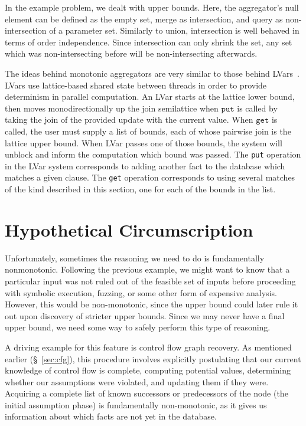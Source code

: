 In the example problem, we dealt with upper bounds.
Here, the aggregator's null element can be defined as the empty set, merge as intersection, and query as non-intersection of a parameter set.
Similarly to union, intersection is well behaved in terms of order independence.
Since intersection can only shrink the set, any set which was non-intersecting before will be non-intersecting afterwards.

The ideas behind monotonic aggregators are very similar to those behind LVars~\cite{lvar}.
LVars use lattice-based shared state between threads in order to provide determinism in parallel computation.
An LVar starts at the lattice lower bound, then moves monodirectionally up the join semilattice when $\texttt{put}$ is called by taking the join of the provided update with the current value.
When $\texttt{get}$ is called, the user must supply a list of bounds, each of whose pairwise join is the lattice upper bound.
When LVar passes one of those bounds, the system will unblock and inform the computation which bound was passed.
The \texttt{put} operation in the LVar system corresponds to adding another fact to the database which matches a given clause.
The \texttt{get} operation corresponds to using several matches of the kind described in this section, one for each of the bounds in the list.

\section{Hypothetical Circumscription}
\label{sec:hypcirc}
Unfortunately, sometimes the reasoning we need to do is fundamentally nonmonotonic.
Following the previous example, we might want to know that a particular input was not ruled out of the feasible set of inputs before proceeding with symbolic execution, fuzzing, or some other form of expensive analysis.
However, this would be non-monotonic, since the upper bound could later rule it out upon discovery of stricter upper bounds.
Since we may never have a final upper bound, we need some way to safely perform this type of reasoning.

A driving example for this feature is control flow graph recovery.
As mentioned earlier (\S~\ref{sec:cfg}), this procedure involves explicitly postulating that our current knowledge of control flow is complete, computing potential values, determining whether our assumptions were violated, and updating them if they were.
Acquiring a complete list of known successors or predecessors of the node (the initial assumption phase) is fundamentally non-monotonic, as it gives us information about which facts are not yet in the database.

